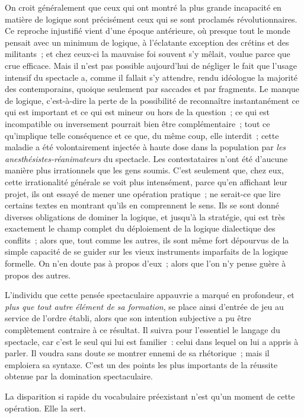 \documentclass[french,twoside]{book} %
\begin{document}
\noindent On croit généralement que ceux qui ont montré la plus grande incapacité en matière de logique sont précisément ceux qui se sont proclamés révolutionnaires. Ce reproche injustifié vient d’une époque antérieure, où presque tout le monde pensait avec un minimum de logique, à l’éclatante exception des crétins et des militants ; et chez ceux-ci la mauvaise foi souvent s’y mêlait, voulue parce que crue efficace. Mais il n’est pas possible aujourd’hui de négliger le fait que l’usage intensif du spectacle a, comme il fallait s’y attendre, rendu idéologue la majorité des contemporains, quoique seulement par saccades et par fragments. Le manque de logique, c’est-à-dire la perte de la possibilité de reconnaître instantanément ce qui est important et ce qui est mineur ou hors de la question ; ce qui est incompatible ou inversement pourrait bien être complémentaire ; tout ce qu’implique telle conséquence et ce que, du même coup, elle interdit ; cette maladie a été volontairement injectée à haute dose dans la population par \emph{les anesthésistes-réanimateurs} du spectacle. Les contestataires n’ont été d’aucune manière plus irrationnels que les gens soumis. C’est seulement que, chez eux, cette irrationalité générale se voit plus intensément, parce qu’en affichant leur projet, ils ont essayé de mener une opération pratique ; ne serait-ce que lire certains textes en montrant qu’ils en comprennent le sens. Ils se sont donné diverses obligations de dominer la logique, et jusqu’à la stratégie, qui est très exactement le champ complet du déploiement de la logique dialectique des conflits ; alors que, tout comme les autres, ils sont même fort dépourvus de la simple capacité de se guider sur les vieux instruments imparfaits de la logique formelle. On n’en doute pas à propos d’eux ; alors que l’on n’y pense guère à propos des autres.\par
L’individu que cette pensée spectaculaire appauvrie a marqué en profondeur, et \emph{plus que tout autre élément de sa formation}, se place ainsi d’entrée de jeu au service de l’ordre établi, alors que son intention subjective a pu être complètement contraire à ce résultat. Il suivra pour l’essentiel le langage du spectacle, car c’est le seul qui lui est familier : celui dans lequel on lui a appris à parler. Il voudra sans doute se montrer ennemi de sa rhétorique ; mais il emploiera sa syntaxe. C’est un des points les plus importants de la réussite obtenue par la domination spectaculaire.\par
La disparition si rapide du vocabulaire préexistant n’est qu’un moment de cette opération. Elle la sert.\par
\end{document}
